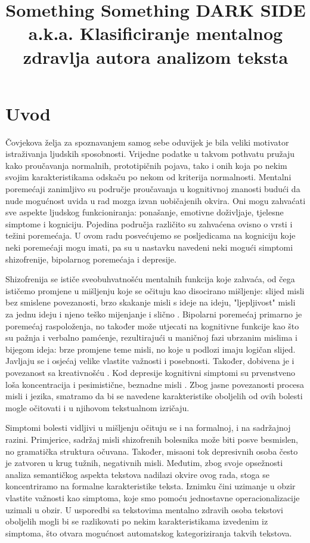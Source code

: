 \documentclass[10pt, a4paper]{article}
\title{Something Something DARK SIDE  a.k.a.  Klasificiranje mentalnog zdravlja autora analizom teksta }
\begin{document}
\maketitleabstract

\section{Uvod}

Čovjekova želja za spoznavanjem samog sebe oduvijek je bila veliki motivator istraživanja ljudskih sposobnosti. Vrijedne podatke u takvom pothvatu pružaju kako proučavanja normalnih, prototipičnih pojava, tako i onih koja po nekim svojim karakteristikama odskaču po nekom od kriterija normalnosti. Mentalni poremećaji zanimljivo su područje proučavanja u kognitivnoj znanosti budući da nude mogućnost uvida u rad mozga izvan uobičajenih okvira. Oni mogu zahvaćati sve aspekte ljudskog funkcioniranja: ponašanje, emotivne doživljaje, tjelesne simptome i kogniciju. Pojedina područja različito su zahvaćena ovisno o vrsti i težini poremećaja. U ovom radu posvećujemo se posljedicama na kogniciju koje neki poremećaji mogu imati, pa su u nastavku navedeni neki mogući simptomi shizofrenije, bipolarnog poremećaja i depresije.

Shizofrenija se ističe sveobuhvatnošću mentalnih funkcija koje zahvaća, od čega ističemo promjene u mišljenju koje se očituju kao disocirano mišljenje: slijed misli bez smislene povezanosti, brzo skakanje misli s ideje na ideju, "ljepljivost" misli za jednu ideju i njeno teško mijenjanje i slično \citep{icd}. Bipolarni poremećaj primarno je poremećaj raspoloženja, no također može utjecati na kognitivne funkcije kao što su pažnja i verbalno pamćenje, rezultirajući u maničnoj fazi ubrzanim mislima i bijegom ideja: brze promjene teme misli, no koje u podlozi imaju logičan slijed. Javljaju se i osjećaj velike vlastite važnosti i posebnosti. Također, dobivena je i povezanost sa kreativnošću \citep{crea}. Kod depresije kognitivni simptomi su prvenstveno loša koncentracija i pesimistične, beznadne misli \citep{dsm}. Zbog jasne povezanosti procesa misli i jezika, smatramo da bi se navedene karakteristike oboljelih od ovih bolesti mogle očitovati i u njihovom tekstualnom izričaju. 

Simptomi bolesti vidljivi u mišljenju očituju se i na formalnoj, i na sadržajnoj razini. Primjerice, sadržaj misli shizofrenih bolesnika može biti posve besmislen, no gramatička struktura očuvana. Također, misaoni tok depresivnih osoba često je zatvoren u krug tužnih, negativnih misli. Međutim, zbog svoje opsežnosti analiza semantičkog aspekta tekstova nadilazi okvire ovog rada, stoga se koncentriramo na formalne karakteristike teksta. Iznimku čini uzimanje u obzir vlastite važnosti kao simptoma, koje smo pomoću jednostavne operacionalizacije uzimali u obzir. U usporedbi sa tekstovima mentalno zdravih osoba tekstovi oboljelih mogli bi se razlikovati po nekim karakteristikama izvedenim iz simptoma, što otvara mogućnost automatskog kategoriziranja takvih tekstova. 
\end{document}
